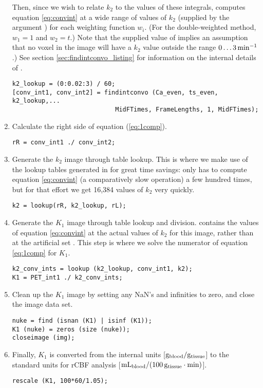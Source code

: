 \begin{enumerate}
Then, since we wish to relate $k_2$ to the values of these integrals,
 computes equation \ref{eq:convint} at a wide range
of values of $k_2$ (supplied by the argument ) for
each weighting function $w_i$.  (For the double-weighted method, $w_1
= 1$ and $w_2 = t$.)  Note that the supplied value of
 implies an assumption that no voxel in the image
will have a $k_2$ value outside the range $0 \ldots 3\, 
{\rm min}^{-1}$.)  See section \ref{sec:findintconvo_listing} for
information on the internal details of .

\begin{verbatim}
k2_lookup = (0:0.02:3) / 60;
[conv_int1, conv_int2] = findintconvo (Ca_even, ts_even, k2_lookup,...
                            MidFTimes, FrameLengths, 1, MidFTimes);
\end{verbatim}

\item Calculate the right side of equation (\ref{eq:1comp}).
\begin{verbatim}
rR = conv_int1 ./ conv_int2;
\end{verbatim}

\item Generate the $k_2$ image through table lookup.  This is where we
  make use of the lookup tables generated in  for
  great time savings:  only has to compute equation
  \ref{eq:convint} (a comparatively slow operation) a few hundred
  times, but for that effort we get 16,384 values of $k_2$ very
  quickly.
\begin{verbatim}
k2 = lookup(rR, k2_lookup, rL);
\end{verbatim}

\item Generate the $K_1$ image through table lookup and division.
   contains the values of equation \ref{eq:convint}
  at the actual values of $k_2$ for this image, rather than at the
  artificial set .  This step is where we solve the
  numerator of equation \ref{eq:1comp} for $K_1$.
\begin{verbatim}
k2_conv_ints = lookup (k2_lookup, conv_int1, k2);
K1 = PET_int1 ./ k2_conv_ints;
\end{verbatim}

\item Clean up the $K_1$ image by setting any NaN's and infinities to
zero, and close the image data set.
\begin{verbatim}
nuke = find (isnan (K1) | isinf (K1));
K1 (nuke) = zeros (size (nuke));
closeimage (img);
\end{verbatim}

\item Finally, $K_1$ is converted from the internal units [${\rm
    g_{blood} / g_{tissue}}$] to the standard units for rCBF
  analysis [${\rm mL_{blood} / (100\, g_{tissue} \cdot min)}$].
\begin{verbatim}
rescale (K1, 100*60/1.05);
\end{verbatim}

\end{enumerate}


